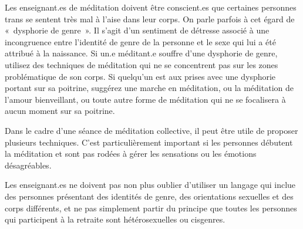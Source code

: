 \documentclass[12pt,openany]{book}
\begin{document}
\noindent Les enseignant.es de méditation doivent être conscient.es que certaines personnes trans se sentent très mal à l’aise dans leur corps. On parle parfois à cet égard de \mbox{« d}ysphorie de genr\mbox{e »}. Il s’agit d’un sentiment de détresse associé à une incongruence entre l’identité de genre de la personne et le sexe qui lui a été attribué à la naissance. Si un.e méditant.e souffre d’une dysphorie de genre, utilisez des techniques de méditation qui ne se concentrent pas sur les zones problématique de son corps. Si quelqu’un est aux prises avec une dysphorie portant sur sa poitrine, suggérez une marche en méditation, ou la méditation de l’amour bienveillant, ou toute autre forme de méditation qui ne se focalisera à aucun moment sur sa poitrine.

Dans le cadre d’une séance de méditation collective, il peut être utile de proposer plusieurs techniques. C’est particulièrement important si les personnes débutent la méditation et sont pas rodées à gérer les sensations ou les émotions désagréables.

Les enseignant.es ne doivent pas non plus oublier d’utiliser un langage qui inclue des personnes présentant des identités de genre, des orientations sexuelles et des corps différents, et ne pas simplement partir du principe que toutes les personnes qui participent à la retraite sont hétérosexuelles ou cisgenres.

\bigskip

\begin{figure}[h]
    \centering
\end{figure}
\end{document}
